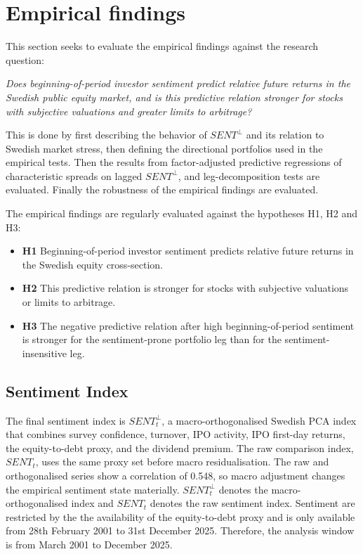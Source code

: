 \documentclass[11pt]{article}
\newcommand{\var}[1]{\ensuremath{#1}}
\begin{document}
\section{Empirical findings}
This section seeks to evaluate the empirical findings against the research question:
\begin{displayquote}
\textit{Does beginning-of-period investor sentiment predict relative future returns in the Swedish public equity market, and is this predictive relation stronger for stocks with subjective valuations and greater limits to arbitrage?}
\end{displayquote}
This is done by first describing the behavior of \var{SENT^{\perp}} and its relation to Swedish market stress, then defining the directional portfolios used in the empirical tests. Then the results from factor-adjusted predictive regressions of characteristic spreads on lagged \var{SENT^{\perp}}, and leg-decomposition tests are evaluated. Finally the robustness of the empirical findings are evaluated.

The empirical findings are regularly evaluated against the hypotheses H1, H2 and H3:
\begin{itemize}
    \item \textbf{H1} Beginning-of-period investor sentiment predicts relative future returns in the Swedish equity cross-section.
    \item \textbf{H2} This predictive relation is stronger for stocks with subjective valuations or limits to arbitrage.
    \item \textbf{H3} The negative predictive relation after high beginning-of-period sentiment is stronger for the sentiment-prone portfolio leg than for the sentiment-insensitive leg.
\end{itemize}

\subsection{Sentiment Index}
The final sentiment index is \var{SENT^{\perp}_{t}}, a macro-orthogonalised Swedish PCA index that combines survey confidence, turnover, IPO activity, IPO first-day returns, the equity-to-debt proxy, and the dividend premium. The raw comparison index, \var{SENT_{t}}, uses the same proxy set before macro residualisation. The raw and orthogonalised series show a correlation of 0.548, so macro adjustment changes the empirical sentiment state materially. \var{SENT^{\perp}_{t}} denotes the macro-orthogonalised index and \var{SENT_{t}} denotes the raw sentiment index. Sentiment are restricted by the the availability of the equity-to-debt proxy and is only available from 28th February 2001 to 31st December 2025. Therefore, the analysis window is from March 2001 to December 2025.
\end{document}
